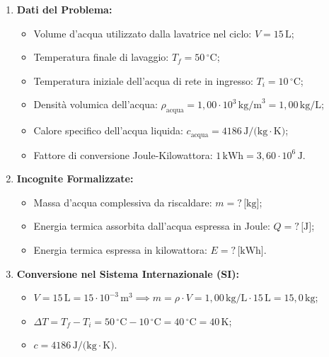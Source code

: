 \documentclass[11pt,a4paper,oneside]{report}
\begin{document}
\begin{problema}
\begin{enumerate}[label=\textbf{Fase \arabic*:}, leftmargin=*, itemsep=5pt]
  \item \textbf{Dati del Problema:}
  \begin{itemize}[leftmargin=*, label=\textbullet]
    \item Volume d'acqua utilizzato dalla lavatrice nel ciclo: $V = 15\,\text{L}$;
    \item Temperatura finale di lavaggio: $T_f = 50\,{^\circ}\text{C}$;
    \item Temperatura iniziale dell'acqua di rete in ingresso: $T_i = 10\,{^\circ}\text{C}$;
    \item Densit\`a volumica dell'acqua: $\rho_{\text{acqua}} = 1{,}00 \cdot 10^3\,\text{kg/m}^3 = 1{,}00\,\text{kg/L}$;
    \item Calore specifico dell'acqua liquida: $c_{\text{acqua}} = 4186\,\text{J/(kg}\cdot\text{K)}$;
    \item Fattore di conversione Joule-Kilowattora: $1\,\text{kWh} = 3{,}60 \cdot 10^6\,\text{J}$.
  \end{itemize}

  \item \textbf{Incognite Formalizzate:}
  \begin{itemize}[leftmargin=*, label=\textbullet]
    \item Massa d'acqua complessiva da riscaldare: $m = ?\,\text{[kg]}$;
    \item Energia termica assorbita dall'acqua espressa in Joule: $Q = ?\,\text{[J]}$;
    \item Energia termica espressa in kilowattora: $E = ?\,\text{[kWh]}$.
  \end{itemize}

  \item \textbf{Conversione nel Sistema Internazionale (SI):}
  \begin{itemize}[leftmargin=*, label=\textbullet]
    \item $V = 15\,\text{L} = 15 \cdot 10^{-3}\,\text{m}^3 \implies m = \rho \cdot V = 1{,}00\,\text{kg/L} \cdot 15\,\text{L} = 15{,}0\,\text{kg}$;
    \item $\Delta T = T_f - T_i = 50\,{^\circ}\text{C} - 10\,{^\circ}\text{C} = 40\,{^\circ}\text{C} = 40\,\text{K}$;
    \item $c = 4186\,\text{J/(kg}\cdot\text{K)}$.
  \end{itemize}


\end{enumerate}
\end{problema}
\end{document}
